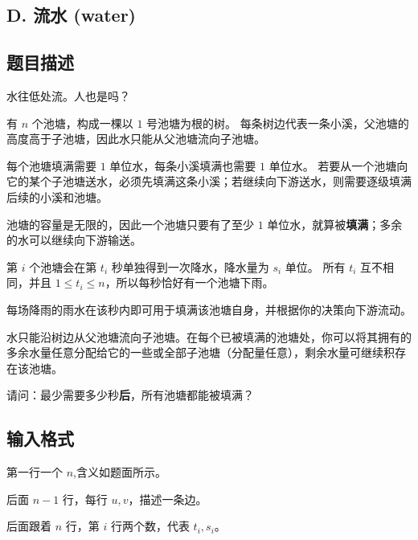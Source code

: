 
\begin{center}
    \section{D. 流水 (water)}
\end{center}

\subsection{题目描述}

水往低处流。人也是吗？

有 $n$ 个池塘，构成一棵以 $1$ 号池塘为根的树。  
每条树边代表一条小溪，父池塘的高度高于子池塘，因此水只能从父池塘流向子池塘。

每个池塘填满需要 $1$ 单位水，每条小溪填满也需要 $1$ 单位水。  
若要从一个池塘向它的某个子池塘送水，必须先填满这条小溪；若继续向下游送水，则需要逐级填满后续的小溪和池塘。

池塘的容量是无限的，因此一个池塘只要有了至少 $1$ 单位水，就算被\textbf{填满}；多余的水可以继续向下游输送。

第 $i$ 个池塘会在第 $t_i$ 秒单独得到一次降水，降水量为 $s_i$ 单位。  
所有 $t_i$ 互不相同，并且 $1 \le t_i \le n$，所以每秒恰好有一个池塘下雨。

每场降雨的雨水在该秒内即可用于填满该池塘自身，并根据你的决策向下游流动。  

水只能沿树边从父池塘流向子池塘。在每个已被填满的池塘处，你可以将其拥有的多余水量任意分配给它的一些或全部子池塘（分配量任意），剩余水量可继续积存在该池塘。

请问：最少需要多少秒\textbf{后}，所有池塘都能被填满？

\subsection{输入格式}

第一行一个 $n$,含义如题面所示。

后面 $n-1$ 行，每行 $u,v$，描述一条边。

后面跟着 $n$ 行，第 $i$ 行两个数，代表 $t_i,s_i$。

